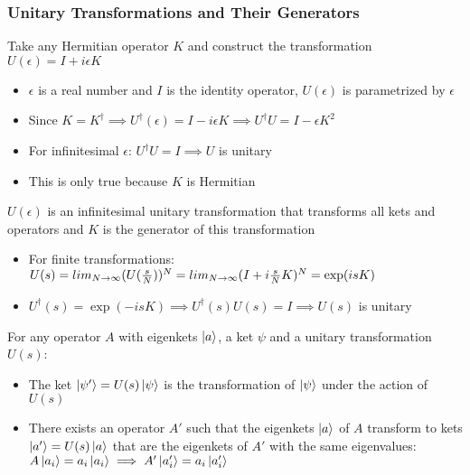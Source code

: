\documentclass[8pt,t,mathserif,aspectratio=169]{beamer}
\begin{document}
\begin{frame}
  \frametitle{Unitary Transformations and Their Generators}
  \vspace{1mm}
  Take any Hermitian operator $K$ and construct the transformation $U(\epsilon) = I + i \epsilon K$
  \begin{itemize}
    \item $\epsilon$ is a real number and $I$ is the identity operator, $U(\epsilon)$ is parametrized by $\epsilon$
    \item Since $K = K^{\dagger} \implies U^{\dagger}(\epsilon) = I - i \epsilon K \implies U^{\dagger} U = I - \epsilon K^2$
    \item For infinitesimal $\epsilon$: $U^{\dagger} U = I \implies U$ is unitary
    \item This is only true because $K$ is Hermitian
  \end{itemize}
  $U(\epsilon)$ is an infinitesimal unitary transformation that transforms all kets and operators and $K$ is the generator of this transformation
  \begin{itemize}
    \item For finite transformations: $U(s) = lim_{N \to \infty} (U({s \over N}))^{N} = lim_{N \to \infty} (I + i {s \over N} K)^{N} = \exp(i s K)$
    \item $U^{\dagger}(s) = \exp(-isK) \implies U^{\dagger}(s) U(s) = I \implies U(s)$ is unitary
  \end{itemize}
  For any operator $A$ with eigenkets $\ket{a}$, a ket $\psi$ and a unitary transformation $U(s)$:
  \begin{itemize}
    \item The ket $\ket{\psi'} = U(s) \ket{\psi}$ is the transformation of $\ket{\psi}$ under the action of $U(s)$
    \item There exists an operator $A'$ such that the eigenkets $\ket{a}$ of $A$ transform to kets $\ket{a'} = U(s) \ket{a}$ that are the eigenkets of $A'$ with the same eigenvalues: $A \ket{a_i} = a_i \ket{a_i} \implies A' \ket{a_i'} = a_i \ket{a_i'}$
  \end{itemize}
\end{frame}
\end{document}
